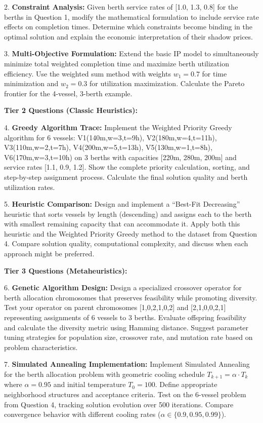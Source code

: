 \documentclass{article}
\begin{document}
2. \textbf{Constraint Analysis:} Given berth service rates of [1.0, 1.3, 0.8] for the berths in Question 1, modify the mathematical formulation to include service rate effects on completion times. Determine which constraints become binding in the optimal solution and explain the economic interpretation of their shadow prices.

3. \textbf{Multi-Objective Formulation:} Extend the basic IP model to simultaneously minimize total weighted completion time and maximize berth utilization efficiency. Use the weighted sum method with weights $w_1 = 0.7$ for time minimization and $w_2 = 0.3$ for utilization maximization. Calculate the Pareto frontier for the 4-vessel, 3-berth example.

\textbf{Tier 2 Questions (Classic Heuristics):}

4. \textbf{Greedy Algorithm Trace:} Implement the Weighted Priority Greedy algorithm for 6 vessels: V1(140m,w=3,t=9h), V2(180m,w=4,t=11h), V3(110m,w=2,t=7h), V4(200m,w=5,t=13h), V5(130m,w=1,t=8h), V6(170m,w=3,t=10h) on 3 berths with capacities [220m, 280m, 200m] and service rates [1.1, 0.9, 1.2]. Show the complete priority calculation, sorting, and step-by-step assignment process. Calculate the final solution quality and berth utilization rates.

5. \textbf{Heuristic Comparison:} Design and implement a ``Best-Fit Decreasing'' heuristic that sorts vessels by length (descending) and assigns each to the berth with smallest remaining capacity that can accommodate it. Apply both this heuristic and the Weighted Priority Greedy method to the dataset from Question 4. Compare solution quality, computational complexity, and discuss when each approach might be preferred.

\textbf{Tier 3 Questions (Metaheuristics):}

6. \textbf{Genetic Algorithm Design:} Design a specialized crossover operator for berth allocation chromosomes that preserves feasibility while promoting diversity. Test your operator on parent chromosomes [1,0,2,1,0,2] and [2,1,0,0,2,1] representing assignments of 6 vessels to 3 berths. Evaluate offspring feasibility and calculate the diversity metric using Hamming distance. Suggest parameter tuning strategies for population size, crossover rate, and mutation rate based on problem characteristics.

7. \textbf{Simulated Annealing Implementation:} Implement Simulated Annealing for the berth allocation problem with geometric cooling schedule $T_{k+1} = \alpha \cdot T_k$ where $\alpha = 0.95$ and initial temperature $T_0 = 100$. Define appropriate neighborhood structures and acceptance criteria. Test on the 6-vessel problem from Question 4, tracking solution evolution over 500 iterations. Compare convergence behavior with different cooling rates ($\alpha \in \{0.9, 0.95, 0.99\}$).
\end{document}
